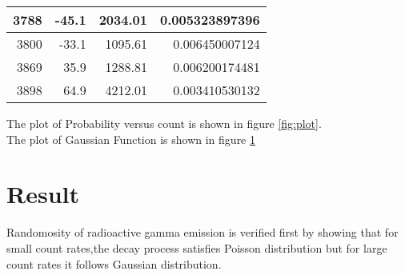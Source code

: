 \begin{longtable}{|r|r|r|r|}
3788                         & -45.1                           & 2034.01                     & 0.005323897396            \\ \hline
3800                         & -33.1                           & 1095.61                     & 0.006450007124            \\ \hline
3869                         & 35.9                            & 1288.81                     & 0.006200174481            \\ \hline
3898                         & 64.9                            & 4212.01                     & 0.003410530132            \\ \hline
\end{longtable}
		The plot of Probability versus count is shown in figure \ref{fig:plot}.\\
		
		The plot of Gaussian Function is shown in figure \ref{fig:plot1}
		
		\begin{figure}
			\centering
			\caption{}
			\label{fig:plot1}
		\end{figure}

	\section{Result}
Randomosity of radioactive gamma emission is verified first by showing that for small count rates,the decay process satisfies Poisson distribution but for large count rates it follows Gaussian distribution.
	
	
